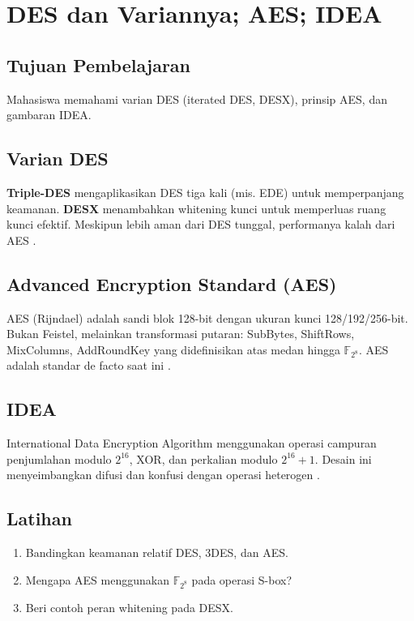 \documentclass[../main.tex]{subfiles}
\begin{document}
\chapter{DES dan Variannya; AES; IDEA}

\section{Tujuan Pembelajaran}
Mahasiswa memahami varian DES (iterated DES, DESX), prinsip AES, dan gambaran IDEA.

\section{Varian DES}
\textbf{Triple-DES} mengaplikasikan DES tiga kali (mis. EDE) untuk memperpanjang keamanan. \textbf{DESX} menambahkan whitening kunci untuk memperluas ruang kunci efektif. Meskipun lebih aman dari DES tunggal, performanya kalah dari AES \citep{stallings}.

\section{Advanced Encryption Standard (AES)}
AES (Rijndael) adalah sandi blok 128-bit dengan ukuran kunci 128/192/256-bit. Bukan Feistel, melainkan transformasi putaran: SubBytes, ShiftRows, MixColumns, AddRoundKey yang didefinisikan atas medan hingga \(\mathbb{F}_{2^8}\). AES adalah standar de facto saat ini \citep{nist_aes}.

\section{IDEA}
International Data Encryption Algorithm menggunakan operasi campuran penjumlahan modulo \(2^{16}\), XOR, dan perkalian modulo \(2^{16}+1\). Desain ini menyeimbangkan difusi dan konfusi dengan operasi heterogen \citep{stallings}.

\section{Latihan}
\begin{enumerate}
  \item Bandingkan keamanan relatif DES, 3DES, dan AES.
  \item Mengapa AES menggunakan \(\mathbb{F}_{2^8}\) pada operasi S-box?
  \item Beri contoh peran whitening pada DESX.
\end{enumerate}
\end{document}
